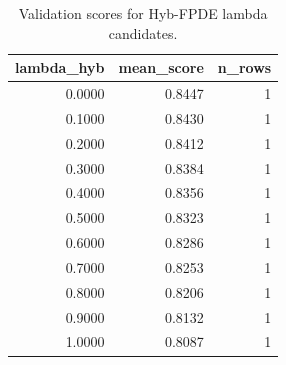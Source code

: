 \begin{table}[t]
\caption{Validation scores for Hyb-FPDE lambda candidates.}
\label{tab:lambda_distribution_computed}
\centering
\begin{tabular}{rrr}
\toprule
lambda\_hyb & mean\_score & n\_rows \\
\midrule
0.0000 & 0.8447 & 1 \\
0.1000 & 0.8430 & 1 \\
0.2000 & 0.8412 & 1 \\
0.3000 & 0.8384 & 1 \\
0.4000 & 0.8356 & 1 \\
0.5000 & 0.8323 & 1 \\
0.6000 & 0.8286 & 1 \\
0.7000 & 0.8253 & 1 \\
0.8000 & 0.8206 & 1 \\
0.9000 & 0.8132 & 1 \\
1.0000 & 0.8087 & 1 \\
\bottomrule
\end{tabular}

\end{table}
